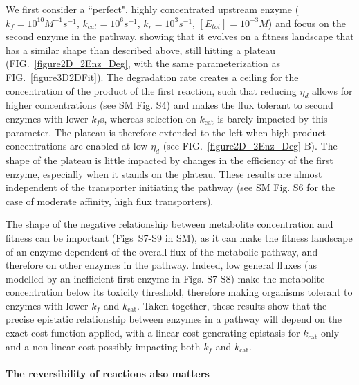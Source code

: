 We first consider a ``perfect", highly concentrated upstream enzyme ($k_f=10^{10}M^{-1}s^{-1}$, $k_{cat}=10^6s^{-1}$, $k_r=10^3s^{-1}$, $[E_{tot}]=10^{-3}M$) and focus on the second enzyme in the pathway, showing that it evolves on a fitness landscape that has a similar shape than described above, still hitting a plateau (FIG.~\ref{figure2D_2Enz_Deg}, with the same parameterization as FIG.~\ref{figure3D2DFit}). The degradation rate creates a ceiling for the concentration of the product of the first reaction, such that reducing $\eta_{d}$ allows for higher concentrations (see SM Fig. S4) and makes the flux tolerant to second enzymes with lower $k_f$s, whereas selection on $k_\text{cat}$ is barely impacted by this parameter. The plateau is therefore extended to the left when high product concentrations are enabled at low $\eta_{d}$ (see FIG.~\ref{figure2D_2Enz_Deg}-B). The shape of the plateau is little impacted by changes in the efficiency of the first enzyme, especially when it stands on the plateau. These results are almost independent of the transporter initiating the pathway %
(see SM Fig. S6 for the case of moderate affinity, high flux transporters). 

The shape of the negative relationship between metabolite concentration and fitness can be important (Figs~S7-S9 in SM), as it can make the fitness landscape of an enzyme dependent of the overall flux of the metabolic pathway, and therefore on other enzymes in the pathway. Indeed, low general fluxes (as modelled by an inefficient first enzyme in Figs. S7-S8) make the metabolite concentration below its toxicity threshold, therefore making organisms tolerant to enzymes with lower $k_f$ and $k_\text{cat}$. Taken together, these results show that the precise epistatic relationship between enzymes in a pathway will depend on the exact cost function applied, with a linear cost generating epistasis for $k_\text{cat}$ only and a non-linear cost possibly impacting both $k_f$ and $k_\text{cat}$.

\noindent \paragraph{The reversibility of reactions also matters}

